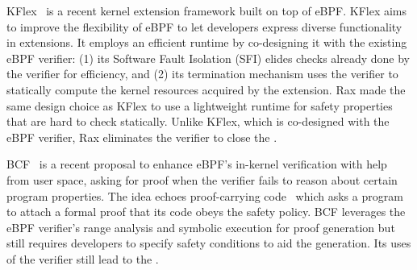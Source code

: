 KFlex~\cite{dwivedi-sosp24} is a recent kernel extension framework built on top of eBPF.
KFlex aims to improve the flexibility of eBPF to let developers express diverse functionality in extensions.
It employs an efficient runtime by co-designing it with the existing eBPF verifier: (1) its Software Fault Isolation (SFI)
    elides checks already done by the verifier for efficiency,
    and (2) its termination mechanism uses the verifier to
    statically compute the kernel resources acquired by the extension.
Rax made the same design choice as KFlex to use a lightweight runtime for safety properties that are hard to
    check statically.
Unlike KFlex, which is co-designed with the eBPF verifier,
    Rax eliminates the verifier to close the \gap{}.

BCF~\cite{lpc-24-bcf-lazy-abstraction-proof} is a recent proposal to enhance eBPF's in-kernel verification
    with help from user space, asking for proof when the
    verifier fails to reason about certain program properties.
The idea echoes proof-carrying code~\cite{necula-pcc} which asks a program to attach a formal proof
    that its code obeys the safety policy.
BCF leverages the eBPF verifier's range analysis and symbolic execution for proof
    generation but still requires developers to specify safety conditions to aid the generation.
Its uses of the verifier still lead to the \gap{}.


